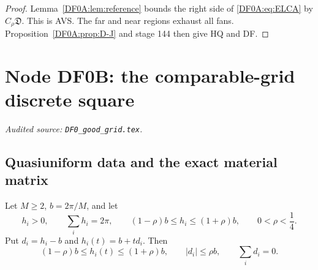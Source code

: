 \documentclass[11pt]{amsart}
\numberwithin{equation}{section}
\theoremstyle{definition}
\theoremstyle{remark}
\begin{document}
\begin{proof}
Lemma~\ref{DF0A:lem:reference} bounds the right side of \eqref{DF0A:eq:ELCA} by
$C_\rho\mathfrak D$.  This is AVS.  The far and near regions exhaust all
fans.  Proposition~\ref{DF0A:prop:D-J} and stage 144 then give HQ and DF.
\end{proof}
\endgroup

\begingroup
\section{Node DF0B: the comparable-grid discrete square}
\label{module:DF0B}
\noindent\textit{Audited source: \nolinkurl{DF0_good_grid.tex}.}
\subsection{Quasiuniform data and the exact material matrix}

Let $M\ge2$, $b=2\pi/M$, and let
\begin{equation}\label{DF0B:eq:quasi}
 h_i>0,\qquad \sum_i h_i=2\pi,
 \qquad (1-\rho)b\le h_i\le(1+\rho)b,
 \qquad 0<\rho<\frac14.
\end{equation}
Put $d_i=h_i-b$ and $h_i(t)=b+td_i$.  Then
\begin{equation}\label{DF0B:eq:path-quasi}
 (1-\rho)b\le h_i(t)\le(1+\rho)b,
 \qquad |d_i|\le\rho b,\qquad \sum_i d_i=0.
\end{equation}
\end{document}
